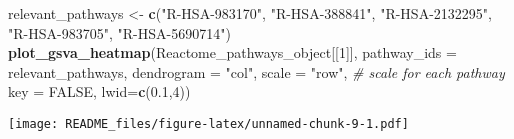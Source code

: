 \documentclass[
]{article}
\newenvironment{Shaded}{\begin{snugshade}}{\end{snugshade}}
\newcommand{\AttributeTok}[1]{\textcolor[rgb]{0.13,0.29,0.53}{#1}}
\newcommand{\CommentTok}[1]{\textcolor[rgb]{0.56,0.35,0.01}{\textit{#1}}}
\newcommand{\ConstantTok}[1]{\textcolor[rgb]{0.56,0.35,0.01}{#1}}
\newcommand{\DecValTok}[1]{\textcolor[rgb]{0.00,0.00,0.81}{#1}}
\newcommand{\FloatTok}[1]{\textcolor[rgb]{0.00,0.00,0.81}{#1}}
\newcommand{\FunctionTok}[1]{\textcolor[rgb]{0.13,0.29,0.53}{\textbf{#1}}}
\newcommand{\NormalTok}[1]{#1}
\newcommand{\OtherTok}[1]{\textcolor[rgb]{0.56,0.35,0.01}{#1}}
\newcommand{\StringTok}[1]{\textcolor[rgb]{0.31,0.60,0.02}{#1}}
\begin{document}
\begin{Shaded}
\begin{Highlighting}[]
\NormalTok{relevant\_pathways }\OtherTok{\textless{}{-}} \FunctionTok{c}\NormalTok{(}\StringTok{"R{-}HSA{-}983170"}\NormalTok{, }\StringTok{"R{-}HSA{-}388841"}\NormalTok{, }\StringTok{"R{-}HSA{-}2132295"}\NormalTok{, }\StringTok{"R{-}HSA{-}983705"}\NormalTok{, }\StringTok{"R{-}HSA{-}5690714"}\NormalTok{)}
\FunctionTok{plot\_gsva\_heatmap}\NormalTok{(Reactome\_pathways\_object[[}\DecValTok{1}\NormalTok{]], }
                  \AttributeTok{pathway\_ids =}\NormalTok{ relevant\_pathways,}
                  \AttributeTok{dendrogram =} \StringTok{"col"}\NormalTok{, }
                  \AttributeTok{scale =} \StringTok{"row"}\NormalTok{, }\CommentTok{\# scale for each pathway}
                  \AttributeTok{key =} \ConstantTok{FALSE}\NormalTok{, }
                  \AttributeTok{lwid=}\FunctionTok{c}\NormalTok{(}\FloatTok{0.1}\NormalTok{,}\DecValTok{4}\NormalTok{)) }
\end{Highlighting}
\end{Shaded}

\texttt{[image: README\_files/figure-latex/unnamed-chunk-9-1.pdf]}
\end{document}
